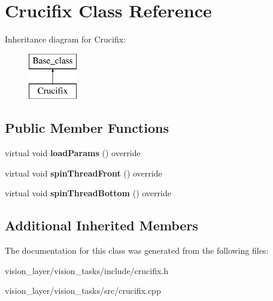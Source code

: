 \hypertarget{classCrucifix}{}\section{Crucifix Class Reference}
\label{classCrucifix}
Inheritance diagram for Crucifix\+:\begin{figure}[H]
\begin{center}
\leavevmode
\includegraphics[height=2.000000cm]{classCrucifix}
\end{center}
\end{figure}
\subsection*{Public Member Functions}
\begin{DoxyCompactItemize}
\item 
\mbox{\label{classCrucifix_ae24529f27f24c27e7feb7032cf053a77}} 
virtual void {\bfseries load\+Params} () override
\item 
\mbox{\label{classCrucifix_a0b540387c8f1ec0a35c72e9d5c2ca56b}} 
virtual void {\bfseries spin\+Thread\+Front} () override
\item 
\mbox{\label{classCrucifix_aa60e6db3bd7731a36b2ae166eb77f464}} 
virtual void {\bfseries spin\+Thread\+Bottom} () override
\end{DoxyCompactItemize}
\subsection*{Additional Inherited Members}


The documentation for this class was generated from the following files\+:\begin{DoxyCompactItemize}
\item 
vision\+\_\+layer/vision\+\_\+tasks/include/crucifix.\+h\item 
vision\+\_\+layer/vision\+\_\+tasks/src/crucifix.\+cpp\end{DoxyCompactItemize}
